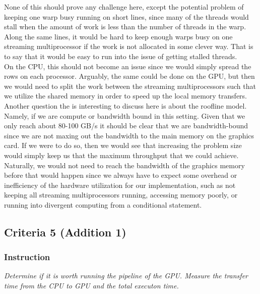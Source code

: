 \documentclass[10pt]{article}
\begin{document}
None of this should prove any challenge here, except the potential problem of keeping one warp busy running on short lines, since many of the threads would stall when the amount of work is less than the number of threads in the warp. Along the same lines, it would be hard to keep enough warps busy on one streaming multiprocessor if the work is not allocated in some clever way. That is to say that it would be easy to run into the issue of getting stalled threads. \\

On the CPU, this should not become an issue since we would simply spread the rows on each processor. Arguably, the same could be done on the GPU, but then we would need to split the work between the streaming multiprocessors such that we utilize the shared memory in order to speed up the local memory transfers. \\

Another question the is interesting to discuss here is about the roofline model. Namely, if we are compute or bandwidth bound in this setting. Given that we only reach about 80-100 GB/s it should be clear that we are bandwidth-bound since we are not maxing out the bandwidth to the main memory on the graphics card. If we were to do so, then we would see that increasing the problem size would simply keep us that the maximum throughput that we could achieve. \\

Naturally, we would not need to reach the bandwidth of the graphics memory before that would happen since we always have to expect some overhead or inefficiency of the hardware utilization for our implementation, such as not keeping all streaming multiprocessors running, accessing memory poorly, or running into divergent computing from a conditional statement. 
\subsection{Criteria 5 (Addition 1)}
\subsubsection{Instruction}
\textit{Determine if it is worth running the pipeline of the GPU. Measure the transfer time from the CPU to GPU and the total executon time.}
\end{document}
